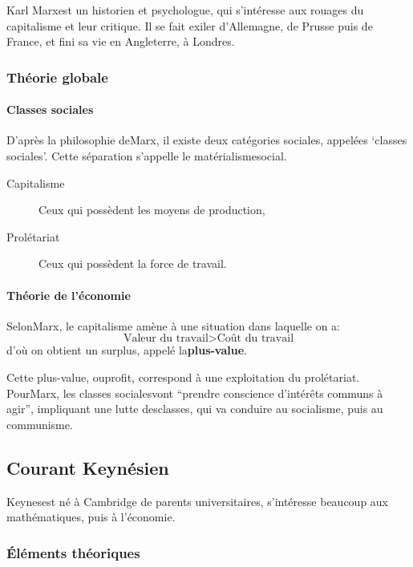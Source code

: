 \documentclass[10pt,a4paper,french]{article}
\begin{document}
Karl Marxest un historien et psychologue, qui s’intéresse aux rouages du capitalisme et leur critique. Il se fait exiler d’Allemagne, de Prusse puis de France, et fini sa vie en Angleterre, à Londres.

\subsubsection{Théorie globale}

\paragraph{Classes sociales}
D’après la philosophie deMarx, il existe deux catégories sociales, appelées `classes sociales'. Cette séparation s’appelle le matérialismesocial.
\begin{description}
\item[Capitalisme] Ceux qui possèdent les moyens de production,
\item[Prolétariat] Ceux qui possèdent la force de travail.
\end{description}

\paragraph{Théorie de l'économie}
SelonMarx, le capitalisme amène à une situation dans laquelle on a: \[ \text{Valeur du travail} > \text{Coût du travail} \] d'où on obtient un surplus, appelé la\textbf{plus-value}.

Cette plus-value, ouprofit, correspond à une exploitation du prolétariat. PourMarx, les classes socialesvont ``prendre conscience d'intérêts communs à agir'', impliquant une lutte desclasses, qui va conduire au socialisme, puis au communisme.

\subsection{Courant Keynésien}

Keynesest né à Cambridge de parents universitaires, s’intéresse beaucoup aux mathématiques, puis à l’économie.

\subsubsection{Éléments théoriques}
\end{document}
